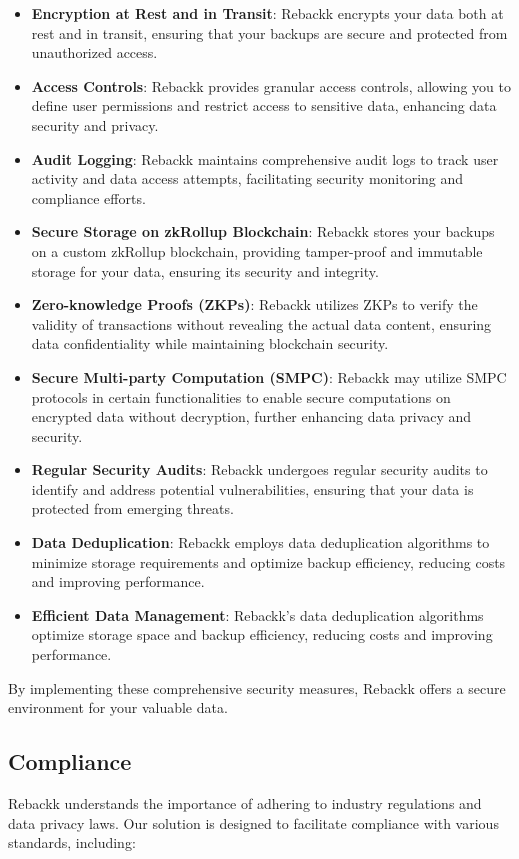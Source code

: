 \documentclass[12pt]{article}
\begin{document}
\begin{itemize}
    \item \textbf{Encryption at Rest and in Transit}: Rebackk encrypts your data both at rest and in transit, ensuring that your backups are secure and protected from unauthorized access.
    \item \textbf{Access Controls}: Rebackk provides granular access controls, allowing you to define user permissions and restrict access to sensitive data, enhancing data security and privacy.
    \item \textbf{Audit Logging}: Rebackk maintains comprehensive audit logs to track user activity and data access attempts, facilitating security monitoring and compliance efforts.
    \item \textbf{Secure Storage on zkRollup Blockchain}: Rebackk stores your backups on a custom zkRollup blockchain, providing tamper-proof and immutable storage for your data, ensuring its security and integrity.
    \item \textbf{Zero-knowledge Proofs (ZKPs)}: Rebackk utilizes ZKPs to verify the validity of transactions without revealing the actual data content, ensuring data confidentiality while maintaining blockchain security.
    \item \textbf{Secure Multi-party Computation (SMPC)}: Rebackk may utilize SMPC protocols in certain functionalities to enable secure computations on encrypted data without decryption, further enhancing data privacy and security.
    \item \textbf{Regular Security Audits}: Rebackk undergoes regular security audits to identify and address potential vulnerabilities, ensuring that your data is protected from emerging threats.
    \item \textbf{Data Deduplication}: Rebackk employs data deduplication algorithms to minimize storage requirements and optimize backup efficiency, reducing costs and improving performance.
    \item \textbf{Efficient Data Management}: Rebackk's data deduplication algorithms optimize storage space and backup efficiency, reducing costs and improving performance.
\end{itemize}
By implementing these comprehensive security measures, Rebackk offers a secure environment for your valuable data.

\subsection{Compliance}
Rebackk understands the importance of adhering to industry regulations and data privacy laws. Our solution is designed to facilitate compliance with various standards, including:
\end{document}
